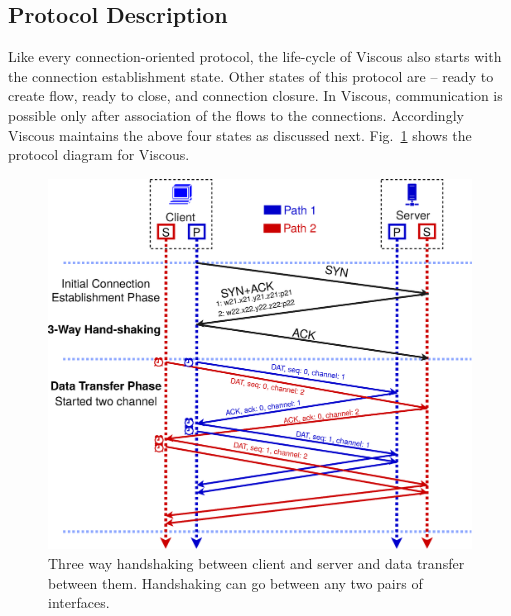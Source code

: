 \subsection{Protocol Description}
Like every connection-oriented protocol, the life-cycle of Viscous also starts with the connection establishment state.
Other states of this protocol are -- ready to create flow,  ready to close, and  connection closure.
In Viscous, communication is possible only after association of the flows to the connections. Accordingly Viscous maintains the above four states as discussed next. Fig.~\ref{fig:ProtocolDiagram} shows the protocol diagram for Viscous. 

\begin{figure}[!ht]
	\centering
	\includegraphics[width=0.8\linewidth]{img/ProtocolDiagram}
	\caption{Three way handshaking between client and server and data transfer between them. Handshaking can go between any two pairs of interfaces.}
	\label{fig:ProtocolDiagram}
\end{figure}


